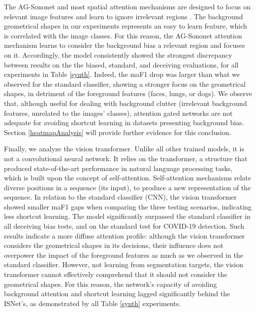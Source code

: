 \documentclass[fleqn,10pt]{wlscirep}
\begin{document}
{The AG-Sononet and most spatial attention mechanisms are designed to focus on relevant image features and learn to ignore irrelevant regions \cite{AGNet}. The background geometrical shapes in our experiments represents an easy to learn feature, which is correlated with the image classes. For this reason, the AG-Sononet attention mechanism learns to consider the background bias a relevant region and focuses on it. Accordingly, the model consistently showed the strongest discrepancy between results on the the biased, standard, and deceiving evaluations, for all experiments in Table \ref{synth}. Indeed, the maF1 drop was larger than what we observed for the standard classifier, showing a stronger focus on the geometrical shapes, in detriment of the foreground features (faces, lungs, or dogs). We observe that, although useful for dealing with background clutter\cite{AGNet} (irrelevant background features, unrelated to the images' classes), attention gated networks are not adequate for avoiding shortcut learning in datasets presenting background bias. Section \ref{heatmapAnalysis} will provide further evidence for this conclusion.

Finally, we analyze the vision transformer\cite{VisionTransformer}. Unlike all other trained models, it is not a convolutional neural network. It relies on the transformer, a structure that produced state-of-the-art performance in natural language processing tasks, which is built upon the concept of self-attention\cite{transformer}. Self-attention mechanisms relate diverse positions in a sequence (its input), to produce a new representation of the sequence\cite{transformer}. In relation to the standard classifier (CNN), the vision transformer showed smaller maF1 gaps when comparing the three testing scenarios, indicating less shortcut learning. The model significantly surpassed the standard classifier in all deceiving bias tests, and on the standard test for COVID-19 detection. Such results indicate a more diffuse attention profile: although the vision transformer considers the geometrical shapes in its decisions, their influence does not overpower the impact of the foreground features as much as we observed in the standard classifier. However, not learning from segmentation targets, the vision transformer cannot effectively comprehend that it should not consider the geometrical shapes. For this reason, the network's capacity of avoiding background attention and shortcut learning lagged significantly behind the ISNet's, as demonstrated by all Table \ref{synth} experiments.

}
\end{document}
